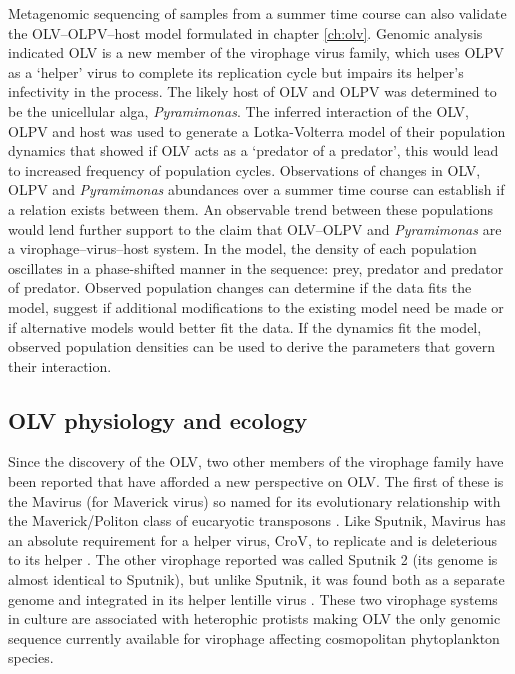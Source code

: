 Metagenomic sequencing of samples from a summer time course can also validate the \ac{OLV}--\ac{OLPV}--host model formulated in chapter \ref{ch:olv}.
Genomic analysis indicated \ac{OLV} is a new member of the virophage virus family, which uses \ac{OLPV} as a `helper' virus to complete its replication cycle but impairs its helper's infectivity in the process.
The likely host of \ac{OLV} and \ac{OLPV} was determined to be the unicellular alga, \emph{Pyramimonas}.
The inferred interaction of the \ac{OLV}, \ac{OLPV} and host was used to generate a Lotka-Volterra model of their population dynamics that showed if \ac{OLV} acts as a `predator of a predator', this would lead to increased frequency of population cycles.
Observations of changes in \ac{OLV}, \ac{OLPV} and \emph{Pyramimonas} abundances over a summer time course can establish if a relation exists between them.
An observable trend between these populations would lend further support to the claim that \ac{OLV}--\ac{OLPV} and \emph{Pyramimonas} are a virophage--virus--host system.
In the model, the density of each population oscillates in a phase-shifted manner in the sequence: prey, predator and predator of predator.
Observed population changes can determine if the data fits the model, suggest if additional modifications to the existing model need be made or if alternative models would better fit the data.
If the dynamics fit the model, observed population densities can be used to derive the parameters that govern their interaction.

\subsection{\acs{OLV} physiology and ecology}
Since the discovery of the \ac{OLV}, two other members of the virophage family have been reported that have afforded a new perspective on \ac{OLV}.
The first of these is the Mavirus (for Maverick virus) so named for its evolutionary relationship with the Maverick/Politon class of eucaryotic transposons \cite{Fischer2011a}.
Like Sputnik, Mavirus has an absolute requirement for a helper virus, \ac{CroV}, to replicate and is deleterious to its helper \cite{Fischer2011a}.
The other virophage reported was called Sputnik 2 (its genome is almost identical to Sputnik), but unlike Sputnik, it was found both as a separate genome and integrated in its helper lentille virus \cite{Desnues2012}.
These two virophage systems in culture are associated with heterophic protists making \ac{OLV} the only genomic sequence currently available for virophage affecting cosmopolitan phytoplankton species.

